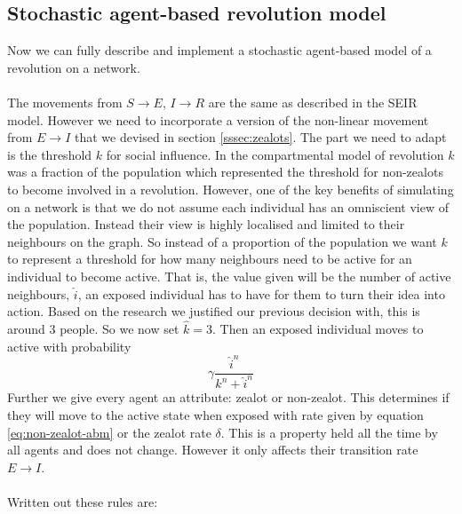 \subsection{Stochastic agent-based revolution model}\label{sec:abm-rev}
Now we can fully describe and implement a stochastic agent-based model of a revolution on a network.\\
\\
The movements from $S\rightarrow E$, $I\rightarrow R$ are the same as described in the SEIR model. However we need to incorporate a version of the non-linear movement from $E\rightarrow I$ that we devised in section \ref{sssec:zealots}. The part we need to adapt is the threshold $k$ for social influence. In the compartmental model of revolution $k$ was a fraction of the population which represented the threshold for non-zealots to become involved in a revolution. However, one of the key benefits of simulating on a network is that we do not assume each individual has an omniscient view of the population. Instead their view is highly localised and limited to their neighbours on the graph. So instead of a proportion of the population we want $k$ to represent a threshold for how many neighbours need to be active for an individual to become active. That is, the value given will be the number of active neighbours, $\hat i$, an exposed individual has to have for them to turn their idea into action. Based on the research we justified our previous decision with, this is around $3$ people\cite{asch-conformity}. So we now set $\hat k=3$. Then an exposed individual moves to active with probability
\begin{equation}\label{eq:non-zealot-abm}
\gamma \frac{\hat i^n}{k^n+\hat i^n}
\end{equation}
Further we give every agent an attribute: zealot or non-zealot. This determines if they will move to the active state when exposed with rate given by equation \ref{eq:non-zealot-abm} or the zealot rate $\delta$. This is a property held all the time by all agents and does not change. However it only affects their transition rate $E\rightarrow I$.\\
\\
Written out these rules are:
